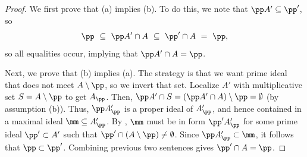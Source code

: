 \begin{proof}
    We first prove that (a) implies (b).
    To do this, we note that $\pp A'\subseteq\pp'$, so
    $$\pp \ \subseteq\ \pp A'\cap A \ \subseteq\ \pp'\cap A \ =\ \pp,$$
    so all equalities occur, implying that $\pp A'\cap A=\pp$.

    Next, we prove that (b) implies (a).
    The strategy is that we want prime ideal 
    that does not meet $A\setminus\pp$, so we invert that set.
    Localize $A'$ with multiplicative set 
    $S=A\setminus\pp$ to get $A_\pp$.
    Then, $\pp A' \cap S = (\pp A'\cap A)\setminus\pp =
    \emptyset$ (by assumption (b)). 
    Thus, $\pp A'_\pp$ is a proper ideal of $A'_\pp$,
    and hence contained in a maximal ideal $\mm \subseteq A'_\pp$.
    By ,
    $\mm$ must be in form $\pp' A'_{\pp}$ for some 
    prime ideal $\pp'\subset A'$ such that $\pp'\cap (A\setminus\pp)\neq\emptyset$.
    Since $\pp A'_\pp\subset \mm$, it follows that 
    $\pp\subset \pp'$.
    Combining previous two sentences gives $\pp'\cap A=\pp$.
\end{proof}
